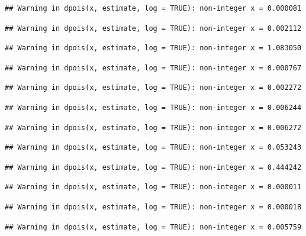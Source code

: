 \documentclass[]{article}
\begin{document}
\begin{verbatim}
## Warning in dpois(x, estimate, log = TRUE): non-integer x = 0.000081
\end{verbatim}

\begin{verbatim}
## Warning in dpois(x, estimate, log = TRUE): non-integer x = 0.002112
\end{verbatim}

\begin{verbatim}
## Warning in dpois(x, estimate, log = TRUE): non-integer x = 1.083050
\end{verbatim}

\begin{verbatim}
## Warning in dpois(x, estimate, log = TRUE): non-integer x = 0.000767
\end{verbatim}

\begin{verbatim}
## Warning in dpois(x, estimate, log = TRUE): non-integer x = 0.002272
\end{verbatim}

\begin{verbatim}
## Warning in dpois(x, estimate, log = TRUE): non-integer x = 0.006244
\end{verbatim}

\begin{verbatim}
## Warning in dpois(x, estimate, log = TRUE): non-integer x = 0.006272
\end{verbatim}

\begin{verbatim}
## Warning in dpois(x, estimate, log = TRUE): non-integer x = 0.053243
\end{verbatim}

\begin{verbatim}
## Warning in dpois(x, estimate, log = TRUE): non-integer x = 0.444242
\end{verbatim}

\begin{verbatim}
## Warning in dpois(x, estimate, log = TRUE): non-integer x = 0.000011
\end{verbatim}

\begin{verbatim}
## Warning in dpois(x, estimate, log = TRUE): non-integer x = 0.000018
\end{verbatim}

\begin{verbatim}
## Warning in dpois(x, estimate, log = TRUE): non-integer x = 0.005759
\end{verbatim}
\end{document}
